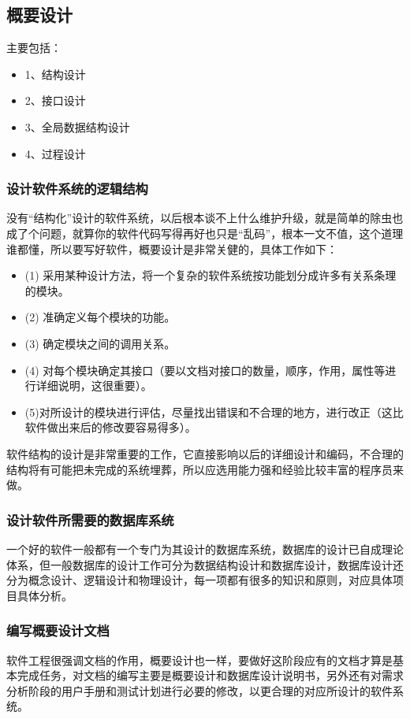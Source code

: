 \documentclass[UTF8,nofonts]{ctexart}
\begin{document}
\subsection{\textbf{概要设计}}
主要包括：
\begin{itemize}
 \setlength{\itemsep}{0pt}
 \setlength{\parskip}{0pt}
 \setlength{\parsep}{0pt}
\item 1、结构设计
\item 2、接口设计
\item	3、全局数据结构设计
\item 4、过程设计
\end{itemize}
\subsubsection{\textbf{设计软件系统的逻辑结构}}
没有“结构化”设计的软件系统，以后根本谈不上什么维护升级，就是简单的除虫也成了个问题，就算你的软件代码写得再好也只是“乱码”，根本一文不值，这个道理谁都懂，所以要写好软件，概要设计是非常关健的，具体工作如下：
\begin{itemize}
 \setlength{\itemsep}{0pt}
 \setlength{\parskip}{0pt}
 \setlength{\parsep}{0pt}
\item (1) 采用某种设计方法，将一个复杂的软件系统按功能划分成许多有关系条理的模块。
\item (2) 准确定义每个模块的功能。
\item (3) 确定模块之间的调用关系。
\item (4) 对每个模块确定其接口（要以文档对接口的数量，顺序，作用，属性等进行详细说明，这很重要）。
\item (5)对所设计的模块进行评估，尽量找出错误和不合理的地方，进行改正（这比软件做出来后的修改要容易得多）。
\end{itemize}
软件结构的设计是非常重要的工作，它直接影响以后的详细设计和编码，不合理的结构将有可能把未完成的系统埋葬，所以应选用能力强和经验比较丰富的程序员来做。
\subsubsection{\textbf{设计软件所需要的数据库系统}}
一个好的软件一般都有一个专门为其设计的数据库系统，数据库的设计已自成理论体系，但一般数据库的设计工作可分为数据结构设计和数据库设计，数据库设计还分为概念设计、逻辑设计和物理设计，每一项都有很多的知识和原则，对应具体项目具体分析。		
\subsubsection{\textbf{编写概要设计文档}}
软件工程很强调文档的作用，概要设计也一样，要做好这阶段应有的文档才算是基本完成任务，对文档的编写主要是概要设计和数据库设计说明书，另外还有对需求分析阶段的用户手册和测试计划进行必要的修改，以更合理的对应所设计的软件系统。
\end{document}

